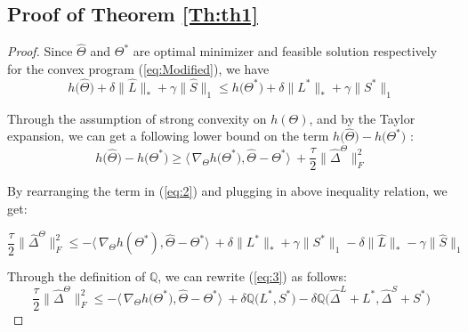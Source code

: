 \documentclass[AMS,STIX1COL]{WileyNJD-v2}
\begin{document}
{\subsection{Proof of Theorem \ref{Th:th1}}
\begin{proof}
Since $\widehat{\Theta}$ and $\Theta^{*}$ are optimal minimizer and feasible solution respectively for the convex program (\ref{eq:Modified}), we have
\begin{equation}\label{eq:2}
    h\big(\widehat{\Theta}\big) + \delta\big\|\widehat{L}\big\|_{*} + \gamma\big\|\widehat{S}\big\|_{1} \leq
     h\big(\Theta^{*}\big) + \delta\big\|{L^{*}}\big\|_{*} + \gamma\big\|{S}^{*}\big\|_{1}
\end{equation}

Through the assumption of strong convexity on $h(\Theta)$, and by the Taylor expansion, we can get a following lower bound on the term $h\big(\widehat{\Theta}\big)-h\big(\Theta^{*}\big)$ :
\[
h\big(\widehat{\Theta}\big)-h\big(\Theta^{*}\big) \geq
\big\langle\, \nabla_{\Theta}h\big(\Theta^{*}\big),\widehat{\Theta}-\Theta^{*}\big\rangle\ + \frac{\tau}{2}\big\|\widehat{\Delta}^{\Theta}\big\|_{F}^{2}
\]

By rearranging the term in (\ref{eq:2}) and plugging in above inequality relation, we get:

\begin{equation}\label{eq:3}
    \frac{\tau}{2}\big\|\widehat{\Delta}^{\Theta}\big\|_{F}^{2} \leq
    -\big\langle\,\nabla_{\Theta}h(\Theta^{*}),\widehat{\Theta}-\Theta^{*}\big\rangle\
    + \delta \big\|L^{*}\big\|_\ast + \gamma \big\|S^{*}\big\|_1
    - \delta \big\|\widehat{L}\big\|_\ast - \gamma \big\|\widehat{S}\big\|_1
\end{equation}

Through the definition of $\mathbb{Q}$, we can rewrite (\ref{eq:3}) as follows:
\begin{equation}\label{eq:4}
    \frac{\tau}{2}\big\|\widehat{\Delta}^{\Theta}\big\|_{F}^{2} \leq
    -\big\langle\,\nabla_{\Theta}h\big(\Theta^{*}\big),\widehat{\Theta}-\Theta^{*}\big\rangle\
    + \delta \mathbb{Q}\big(L^{*},S^{*}\big) - \delta \mathbb{Q}\big(\widehat{\Delta}^L + L^{*},\widehat{\Delta}^S + S^{*}\big)
\end{equation}


\end{proof}}
\end{document}
